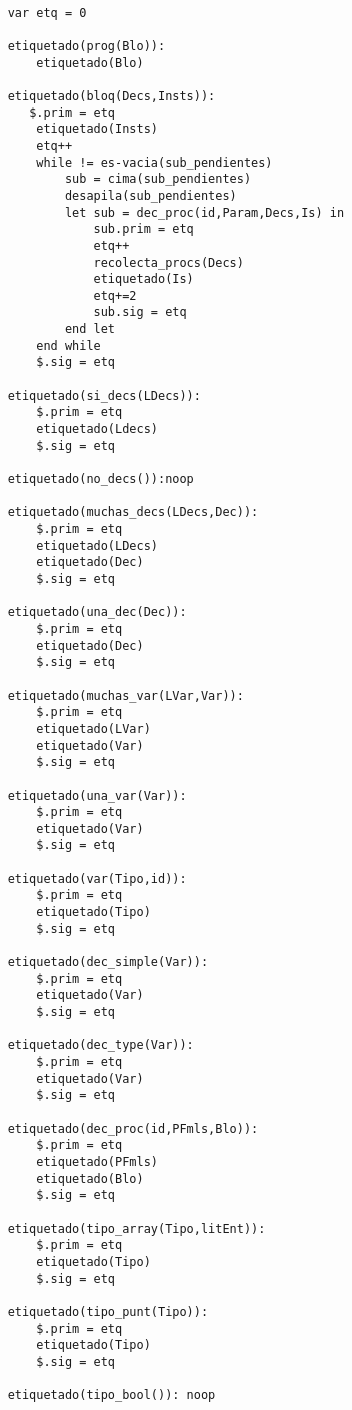 \begin{lstlisting}

    var etq = 0 

    etiquetado(prog(Blo)):
        etiquetado(Blo)

    etiquetado(bloq(Decs,Insts)):
       $.prim = etq
        etiquetado(Insts)
        etq++
        while != es-vacia(sub_pendientes)
            sub = cima(sub_pendientes)
            desapila(sub_pendientes)
            let sub = dec_proc(id,Param,Decs,Is) in
                sub.prim = etq
                etq++
                recolecta_procs(Decs)
                etiquetado(Is)
                etq+=2
                sub.sig = etq
            end let
        end while
        $.sig = etq
    
    etiquetado(si_decs(LDecs)):
        $.prim = etq
        etiquetado(Ldecs)
        $.sig = etq
    
    etiquetado(no_decs()):noop
    
    etiquetado(muchas_decs(LDecs,Dec)):
        $.prim = etq
        etiquetado(LDecs)
        etiquetado(Dec)
        $.sig = etq
    
    etiquetado(una_dec(Dec)):
        $.prim = etq
        etiquetado(Dec)
        $.sig = etq

    etiquetado(muchas_var(LVar,Var)):
        $.prim = etq
        etiquetado(LVar)
        etiquetado(Var)
        $.sig = etq

    etiquetado(una_var(Var)):
        $.prim = etq
        etiquetado(Var)
        $.sig = etq
    
    etiquetado(var(Tipo,id)):
        $.prim = etq
        etiquetado(Tipo)
        $.sig = etq
    
    etiquetado(dec_simple(Var)):
        $.prim = etq
        etiquetado(Var)
        $.sig = etq

    etiquetado(dec_type(Var)):
        $.prim = etq
        etiquetado(Var)
        $.sig = etq
    
    etiquetado(dec_proc(id,PFmls,Blo)):
        $.prim = etq
        etiquetado(PFmls)
        etiquetado(Blo)
        $.sig = etq

    etiquetado(tipo_array(Tipo,litEnt)):
        $.prim = etq
        etiquetado(Tipo)
        $.sig = etq

    etiquetado(tipo_punt(Tipo)):
        $.prim = etq
        etiquetado(Tipo)
        $.sig = etq

    etiquetado(tipo_bool()): noop


\end{lstlisting}
